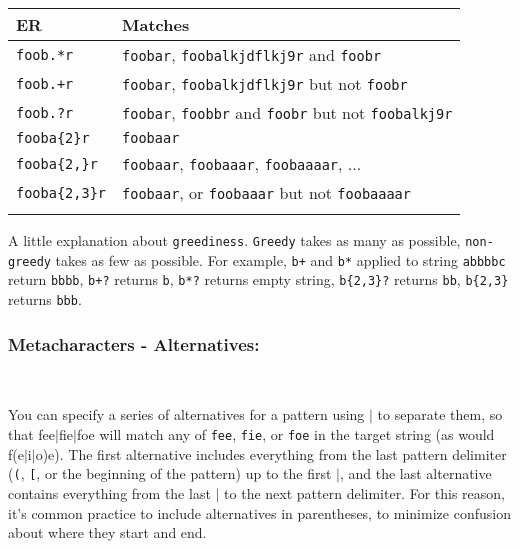 \begin{footnotesize}
  \begin{tabularx}{\textwidth}{>{\hsize=0.3\hsize}X>{\hsize=0.7\hsize}X}\\
    \hline
    \textbf{ER} & \textbf{Matches} \\
    \hline
    \texttt{foob.*r} & \texttt{foobar}, \texttt{foobalkjdflkj9r} and \texttt{foobr} \\
    \texttt{foob.+r} & \texttt{foobar}, \texttt{foobalkjdflkj9r} but not \texttt{foobr} \\
    \texttt{foob.?r} & \texttt{foobar}, \texttt{foobbr} and \texttt{foobr} but not \texttt{foobalkj9r} \\
    \texttt{fooba\{2\}r} & \texttt{foobaar} \\
    \texttt{fooba\{2,\}r} & \texttt{foobaar}, \texttt{foobaaar}, \texttt{foobaaaar}, ... \\
    \texttt{fooba\{2,3\}r} & \texttt{foobaar}, or \texttt{foobaaar} but not \texttt{foobaaaar} \\
    \hline
    \\
  \end{tabularx}
\end{footnotesize}

A little explanation about \texttt{greediness}. \texttt{Greedy} takes as
many as possible, \texttt{non-greedy} takes as few as possible. For
example, \texttt{b+} and \texttt{b*} applied to string \texttt{abbbbc}
return \texttt{bbbb}, \texttt{b+?} returns \texttt{b}, \texttt{b*?}
returns empty string, \texttt{b\{2,3\}?} returns \texttt{bb},
\texttt{b\{2,3\}} returns \texttt{bbb}.


\subsubsection{Metacharacters - Alternatives:}\\

You can specify a series of alternatives for a pattern using \texttt{$|$}
to separate them, so that fee$|$fie$|$foe will match any of \texttt{fee},
\texttt{fie}, or \texttt{foe} in the target string (as would f(e$|$i$|$o)e).
The first alternative includes everything from the last pattern delimiter
(\texttt{(}, \texttt{[}, or the beginning of the pattern) up to the first
\texttt{$|$}, and the last alternative contains everything from the last
\texttt{$|$} to the next pattern delimiter. For this reason, it's common
practice to include alternatives in parentheses, to minimize confusion
about where they start and end.

